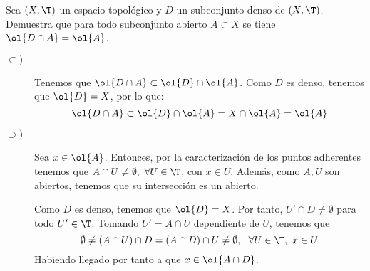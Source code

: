 \begin{ejercicio}
    Sea $(X,\T)$ un espacio topológico y $D$ un subconjunto denso de $(X,\T)$. Demuestra que para todo subconjunto abierto $A\subset X$ se tiene $\ol{D\cap A}=\ol{A}$.
    \begin{description}
        \item[$\subset)$]
            Tenemos que $\ol{D\cap A}\subset \ol{D}\cap \ol{A}$. Como $D$ es denso, tenemos que $\ol{D}=X$, por lo que:
            \begin{equation*}
                \ol{D\cap A}\subset \ol{D}\cap \ol{A} = X\cap \ol{A}=\ol{A}
            \end{equation*}
            
        \item[$\supset)$] Sea $x\in \ol{A}$. Entonces, por la caracterización de los puntos adherentes tenemos que $A\cap U\neq \emptyset,~\forall U\in \T$, con $x\in U$. Además, como $A,U$ son abiertos, tenemos que su intersección es un abierto.

        Como $D$ es denso, tenemos que $\ol{D}=X$. Por tanto, $U'\cap D\neq \emptyset$ para todo $U'\in \T$. Tomando $U'=A\cap U$ dependiente de $U$, tenemos que
        $$\emptyset \neq (A\cap U)\cap D = (A\cap D)\cap U\neq \emptyset,~~\forall U\in \T,~x\in U$$
        Habiendo llegado por tanto a que $x\in \ol{A\cap D}$.
    \end{description}
\end{ejercicio}

